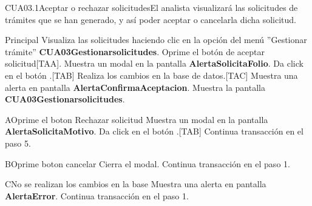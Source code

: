 \begin{UseCase}{CUA03.1}{Aceptar o rechazar solicitudes}{El analista 
visualizará las solicitudes de trámites que se han generado, y así poder 
aceptar o cancelarla dicha solicitud.}
\end{UseCase}

\begin{UCtrayectoria}{Principal}
  \UCpaso[\UCactor] Visualiza las solicitudes haciendo clic en la opción del menú ''Gestionar trámite'' {\bf CUA03Gestionarsolicitudes}.
  \UCpaso [\UCactor] Oprime el botón de aceptar solicitud[TAA].
	\UCpaso Muestra un modal en la pantalla {\bf AlertaSolicitaFolio}.
  \UCpaso [\UCactor] Da click en el botón .[TAB]
	\UCpaso Realiza los cambios en la base de datos.[TAC]
	\UCpaso Muestra una alerta en pantalla {\bf AlertaConfirmaAceptacion}.
	\UCpaso Muestra la pantalla {\bf CUA03Gestionarsolicitudes}.
\end{UCtrayectoria}

\begin{UCtrayectoriaA}{A}{Oprime el boton Rechazar solicitud} 
	\UCpaso Muestra un modal en la pantalla {\bf AlertaSolicitaMotivo}.
  \UCpaso [\UCactor] Da click en el botón .[TAB]
	\UCpaso Continua transacción en el paso 5.
\end{UCtrayectoriaA}

\begin{UCtrayectoriaA}{B}{Oprime boton cancelar} 
  \UCpaso Cierra el modal.
  \UCpaso Continua transacción en el paso 1.
\end{UCtrayectoriaA}

\begin{UCtrayectoriaA}{C}{No se realizan los cambios en la base} 
  \UCpaso  Muestra una alerta en pantalla {\bf AlertaError}.
  \UCpaso Continua transacción en el paso 1.
\end{UCtrayectoriaA}

